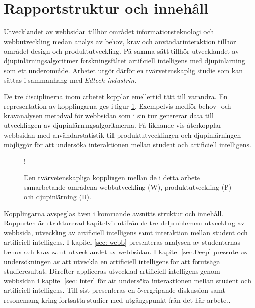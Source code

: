 \section{Rapportstruktur och innehåll}
Utvecklandet av webbsidan tillhör området informationsteknologi och webbutveckling medan analys av behov, krav och användarinteraktion tillhör området design och produktutveckling. På samma sätt tillhör utvecklandet av djupinlärningsalgoritmer forskningsfältet artificiell intelligens med djupinlärning som ett underområde. Arbetet utgör därför en tvärvetenskaplig studie som kan sättas i sammanhang med \emph{Edtech-industrin}.

De tre disciplinerna inom arbetet kopplar emellertid tätt till varandra. En representation av kopplingarna ges i figur \ref{fig:project_structure}. Exempelvis medför behov- och kravanalysen metodval för webbsidan som i sin tur genererar data till utvecklingen av djupinlärningsalgoritmerna. På liknande vis återkopplar webbsidan med användarstatistik till produktutvecklingen och djupinlärningen möjliggör för att undersöka interaktionen mellan student och artificiell intelligens.

\begin{figure}[hbtp]
    \centering
    \hspace{25px}
    \resizebox {0.5\textwidth} {!} {
        
    }
    \caption{Den tvärvetenskapliga kopplingen mellan de i detta arbete samarbetande områdena webbutveckling (W), produktutveckling (P) och djupinlärning (D). }
    \label{fig:project_structure}
\end{figure}

Kopplingarna avspeglas även i kommande avsnitts struktur och innehåll. Rapporten är strukturerad kapitelvis utifrån de tre delproblemen: utveckling av webbsida, utveckling av artificiell intelligens samt interaktion mellan student och artificiell intelligens. I kapitel \ref{sec: webb} presenteras analysen av studenternas behov och krav samt utvecklandet av webbsidan. I kapitel \ref{sec:Deep} presenteras undersökningen av att utveckla en artificiell intelligens för att förutsäga studieresultat. Därefter appliceras utvecklad artificiell intelligens genom webbsidan i kapitel \ref{sec: inter} för att undersöka interaktionen mellan student och artificiell intelligens. Till sist presenteras en övergripande diskussion samt resonemang kring fortsatta studier med utgångspunkt från det här arbetet.







